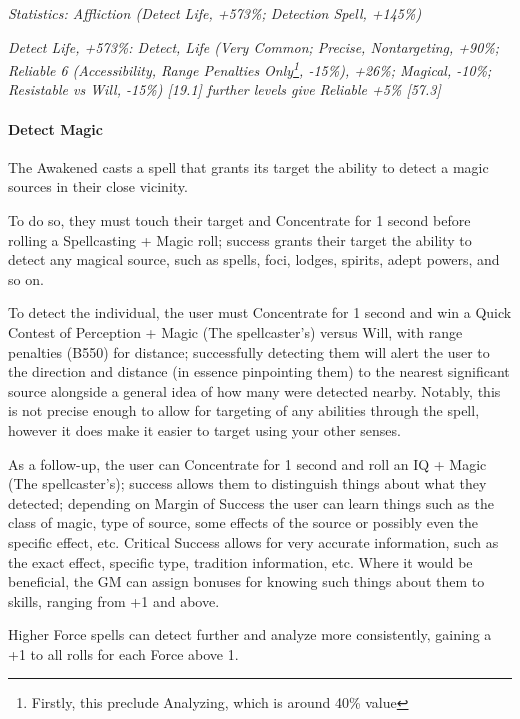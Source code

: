 \begin{multicols*}{3}
	\textcolor{OliveGreen}{\textit{ Statistics: Affliction (Detect Life, +573\%; Detection Spell, +145\%) }}
	
	\textcolor{OliveGreen}{\textit{Detect Life, +573\%: Detect, Life (Very Common; Precise, Nontargeting, +90\%; Reliable 6 (Accessibility, Range Penalties Only\footnote{Firstly, this preclude Analyzing, which is around 40\% value}, -15\%), +26\%; Magical, -10\%; Resistable vs Will, -15\%) [19.1] further levels give Reliable +5\% [57.3]}}
		
	\paragraph{Detect Magic}
	
	The Awakened casts a spell that grants its target the ability to detect a magic sources in their close vicinity.
	
	To do so, they must touch their target and Concentrate for 1 second before rolling a Spellcasting + Magic roll; success grants their target the ability to detect any magical source, such as spells, foci, lodges, spirits, adept powers, and so on.
	
	To detect the individual, the user must Concentrate for 1 second and win a Quick Contest of Perception + Magic (The spellcaster's) versus Will, with range penalties (B550) for distance; successfully detecting them will alert the user to the direction and distance (in essence pinpointing them) to the nearest significant source alongside a general idea of how many were detected nearby. Notably, this is not precise enough to allow for targeting of any abilities through the spell, however it does make it easier to target using your other senses.
	
	As a follow-up, the user can Concentrate for 1 second and roll an IQ + Magic (The spellcaster's); success allows them to distinguish things about what they detected; depending on Margin of Success the user can learn things such as the class of magic, type of source, some effects of the source or possibly even the specific effect, etc. Critical Success allows for very accurate information, such as the exact effect, specific type, tradition information, etc. Where it would be beneficial, the GM can assign bonuses for knowing such things about them to skills, ranging from +1 and above.
	
	Higher Force spells can detect further and analyze more consistently, gaining a +1 to all rolls for each Force above 1.	
	

\end{multicols*}
